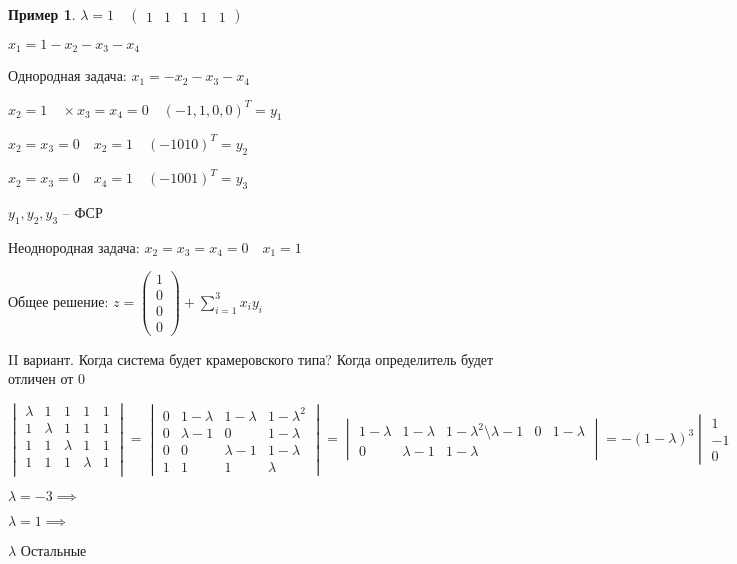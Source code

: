 \documentclass{book}
\theoremstyle{definition}
\newtheorem*{example}{Пример}
\begin{document}
\begin{example}
    $\lambda=1\quad  \begin{pmatrix} 1&1&1&1&1 \end{pmatrix} $ 

    $x_1 = 1-x_2-x_3-x_4$

    Однородная задача: $x_1 = -x_2-x_3-x_4$

    $x_2 = 1\quad \times x_3=x_4 = 0\quad \left( -1,1,0,0 \right)^T  = y_1$

    $x_2=x_3=0\quad x_2=1\quad \left( -1010 \right) ^T = y_2$

    $x_2=x_3=0\quad x_4=1\quad \left( -1001 \right) ^T = y_3$

    $y_1, y_2, y_3$ -- ФСР

    Неоднородная задача: $x_2=x_3=x_4=0\quad x_1=1$

    Общее решение: $z = \begin{pmatrix} 1\\0\\0\\0 \end{pmatrix}  + \sum_{i=1}^{3} x_iy_i$ 

    II вариант. Когда система будет крамеровского типа? Когда определитель будет отличен от 0

    $
    \begin{vmatrix}
        \lambda&1&1&1&1\\1&\lambda&1&1&1\\1&1&\lambda&1&1\\ 1&1&1&\lambda&1\\
    \end{vmatrix} = 
    \begin{vmatrix}
        0&1-\lambda&1-\lambda&1-\lambda^2\\0&\lambda-1&0&1-\lambda\\0&0&\lambda-1&1-\lambda\\1&1&1&\lambda
    \end{vmatrix} = 
    \begin{vmatrix}
        1-\lambda&1-\lambda&1-\lambda^2\setminus \lambda-1&0&1-\lambda\\0&\lambda-1&1-\lambda
    \end{vmatrix} = -(1-\lambda)^3 
    \begin{vmatrix}
        1&1&1+\lambda\\-1&0&1\\0&-1&1
    \end{vmatrix} = -\left( 1-\lambda \right) ^3
    \begin{vmatrix}
        1&1&1+\lambda\\0&1&2+\lambda\\ 0&-1&1
    \end{vmatrix} = (1-\lambda)^3
    \begin{vmatrix}
        1&2+\lambda\\-1&1
    \end{vmatrix} = (\lambda-1)^3(\lambda+3) = 0$

    $\lambda = -3 \implies $

    $\lambda = 1 \implies $

    $\lambda$ Остальные
\end{example}
\end{document}
